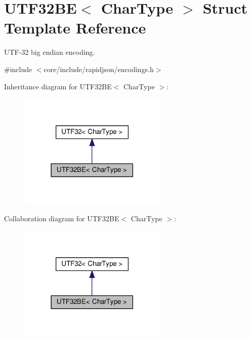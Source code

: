 \hypertarget{structUTF32BE}{}\section{U\+T\+F32\+BE$<$ Char\+Type $>$ Struct Template Reference}
\label{structUTF32BE}


U\+T\+F-\/32 big endian encoding.  




{\ttfamily \#include $<$core/include/rapidjson/encodings.\+h$>$}



Inheritance diagram for U\+T\+F32\+BE$<$ Char\+Type $>$\+:
\nopagebreak
\begin{figure}[H]
\begin{center}
\leavevmode
\includegraphics[width=201pt]{structUTF32BE__inherit__graph}
\end{center}
\end{figure}


Collaboration diagram for U\+T\+F32\+BE$<$ Char\+Type $>$\+:
\nopagebreak
\begin{figure}[H]
\begin{center}
\leavevmode
\includegraphics[width=201pt]{structUTF32BE__coll__graph}
\end{center}
\end{figure}
